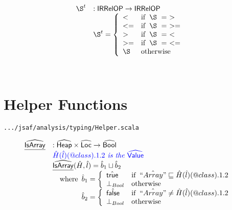 \[\begin{array}{ll}
\\\\
\rel^t &: \SF{IRRelOP} \rightarrow \SF{IRRelOP}\\
& \rel^ t = \left\{
  \begin{array}{ll}
    < & \ifc{ \rel ~=~ >}\\
    <= & \ifc{ \rel ~=~ >=}\\
    > & \ifc{ \rel ~=~ <}\\
    >= & \ifc{ \rel ~=~ <=}\\
    \rel & \owc \\
  \end{array}
\right.\\
\\\\
\end{array}
\]


\section{Helper Functions}
{\inblue\tt .../jsaf/analysis/typing/Helper.scala}

\[
\begin{array}{ll}
\widehat{\underline{\sf IsArray}} & : \widehat{\mbox{\textsf{Heap}}} \times \widehat{\mbox{\textsf{Loc}}} \rightarrow \widehat{\mbox{\textsf{Bool}}} \\
& {\color{blue} \hat{H}(\hat{l})(@class).1.2\textit{ is the }\widehat{\mbox{\textsf{Value}}}} \\
& \widehat{\underline{\sf IsArray}}(\hat{H},\hat{l}) = \hat{b}_1\sqcup\hat{b}_2\\
& \quad{\rm where}\begin{array}[t]{l}
    \hat{b}_1=\left\{
      \begin{array}{ll}
        \hat{\mbox{\textsf{true}}} &{\rm if}\begin{array}[t]{l}\hat{``Array"} \sqsubseteq \hat{H}(\hat{l})(@class).1.2\end{array}\\
        \bot_{Bool} & {\rm otherwise} \\
      \end{array}
    \right.\\
    \hat{b}_2 = \left\{
      \begin{array}{ll}
        \hat{\mbox{\textsf{false}}} & {\rm if}\begin{array}[t]{l}\hat{``Array"} \neq \hat{H}(\hat{l})(@class).1.2\end{array}\\
        \bot_{Bool} & {\rm otherwise}\\
      \end{array}
    \right.\\
  \end{array}\\
\\
\end{array}
\]

